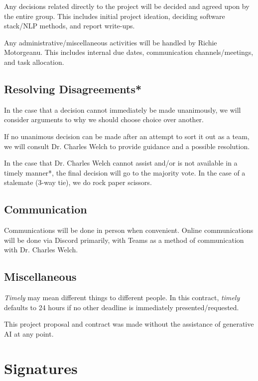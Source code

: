 \documentclass[11pt, letterpaper, notitlepage]{Article}
\begin{document}
Any decisions related directly to the project will be decided and agreed upon by the entire group. This includes  initial project ideation, deciding software stack/NLP methods, and report write-ups.

Any administrative/miscellaneous activities will be handled by Richie Motorgeanu. This includes internal due dates, communication channels/meetings, and task allocation.

\subsection{Resolving Disagreements*}

In the case that a decision cannot immediately be made unanimously, we will consider arguments to why we should choose choice over another.

If no unanimous decision can be made after an attempt to sort it out as a team, we will consult Dr. Charles Welch to provide guidance and a possible resolution.

In the case that Dr. Charles Welch cannot assist and/or is not available in a timely manner*, the final decision will go to the majority vote. In the case of a stalemate (3-way tie), we do rock paper scissors.

\subsection{Communication}

Communications will be done in person when convenient. Online communications will be done via Discord primarily, with Teams as a method of communication with Dr. Charles Welch.

\subsection{Miscellaneous}

\textit{Timely} may mean different things to different people. In this contract, \textit{timely} defaults to 24 hours if no other deadline is immediately presented/requested.

This project proposal and contract was made without the assistance of generative AI at any point.


\newpage

\section[3]{Signatures}
\end{document}
